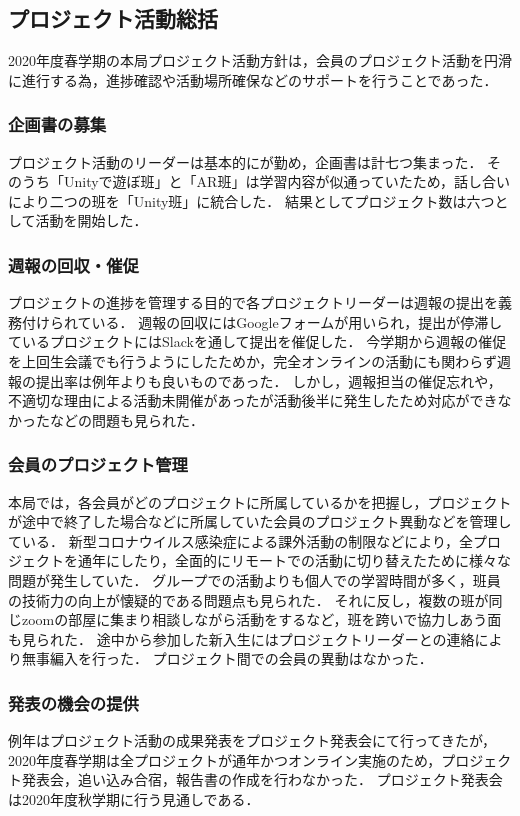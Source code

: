 \subsection*{プロジェクト活動総括}


2020年度春学期の本局プロジェクト活動方針は，会員のプロジェクト活動を円滑に進行する為，進捗確認や活動場所確保などのサポートを行うことであった．

\subsubsection*{企画書の募集}

プロジェクト活動のリーダーは基本的に\secondGrade{}が勤め，企画書は計七つ集まった．
そのうち「Unityで遊ぼ班」と「AR班」は学習内容が似通っていたため，話し合いにより二つの班を「Unity班」に統合した．
結果としてプロジェクト数は六つとして活動を開始した．

\subsubsection*{週報の回収・催促}

プロジェクトの進捗を管理する目的で各プロジェクトリーダーは週報の提出を義務付けられている．
週報の回収にはGoogleフォームが用いられ，提出が停滞しているプロジェクトにはSlackを通して提出を催促した．
今学期から週報の催促を上回生会議でも行うようにしたためか，完全オンラインの活動にも関わらず週報の提出率は例年よりも良いものであった．
しかし，週報担当の催促忘れや，不適切な理由による活動未開催があったが活動後半に発生したため対応ができなかったなどの問題も見られた．

\subsubsection*{会員のプロジェクト管理}

本局では，各会員がどのプロジェクトに所属しているかを把握し，プロジェクトが途中で終了した場合などに所属していた会員のプロジェクト異動などを管理している．
新型コロナウイルス感染症による課外活動の制限などにより，全プロジェクトを通年にしたり，全面的にリモートでの活動に切り替えたために様々な問題が発生していた．
グループでの活動よりも個人での学習時間が多く，班員の技術力の向上が懐疑的である問題点も見られた．
それに反し，複数の班が同じzoomの部屋に集まり相談しながら活動をするなど，班を跨いで協力しあう面も見られた．
途中から参加した新入生にはプロジェクトリーダーとの連絡により無事編入を行った．
プロジェクト間での会員の異動はなかった．

\subsubsection*{発表の機会の提供}

例年はプロジェクト活動の成果発表をプロジェクト発表会にて行ってきたが，2020年度春学期は全プロジェクトが通年かつオンライン実施のため，プロジェクト発表会，追い込み合宿，報告書の作成を行わなかった．
プロジェクト発表会は2020年度秋学期に行う見通しである．
